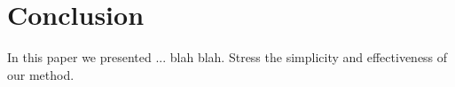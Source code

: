 \section{Conclusion}

In this paper we presented ... blah blah.
Stress the simplicity and effectiveness of our method.